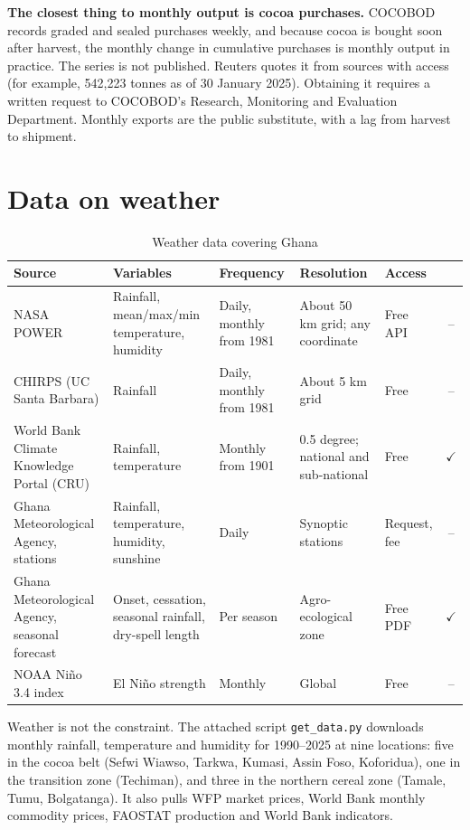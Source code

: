 \documentclass[11pt,letterpaper]{article}
\newcommand{\ok}{$\checkmark$}
\newcommand{\no}{--}
\begin{document}
\textbf{The closest thing to monthly output is cocoa purchases.} COCOBOD records graded and sealed purchases weekly, and because cocoa is bought soon after harvest, the monthly change in cumulative purchases is monthly output in practice. The series is not published. Reuters quotes it from sources with access (for example, 542,223 tonnes as of 30 January 2025). Obtaining it requires a written request to COCOBOD's Research, Monitoring and Evaluation Department. Monthly exports are the public substitute, with a lag from harvest to shipment.

\section{Data on weather}

\begin{table}[H]
\centering\footnotesize
\caption{Weather data covering Ghana}\label{tab:weather}
\begin{tabularx}{\textwidth}{P{3.1cm} L P{2.2cm} P{2.4cm} P{2.2cm} c}
\toprule
\textbf{Source} & \textbf{Variables} & \textbf{Frequency} & \textbf{Resolution} & \textbf{Access} & \\
\midrule
NASA POWER & Rainfall, mean/max/min temperature, humidity & Daily, monthly from 1981 & About 50 km grid; any coordinate & Free API & \no \\
CHIRPS (UC Santa Barbara) & Rainfall & Daily, monthly from 1981 & About 5 km grid & Free & \no \\
World Bank Climate Knowledge Portal (CRU) & Rainfall, temperature & Monthly from 1901 & 0.5 degree; national and sub-national & Free & \ok \\
Ghana Meteorological Agency, stations & Rainfall, temperature, humidity, sunshine & Daily & Synoptic stations & Request, fee & \no \\
Ghana Meteorological Agency, seasonal forecast & Onset, cessation, seasonal rainfall, dry-spell length & Per season & Agro-ecological zone & Free PDF & \ok \\
NOAA Ni\~no 3.4 index & El Ni\~no strength & Monthly & Global & Free & \no \\
\bottomrule
\end{tabularx}
\end{table}

Weather is not the constraint. The attached script \texttt{get\_data.py} downloads monthly rainfall, temperature and humidity for 1990--2025 at nine locations: five in the cocoa belt (Sefwi Wiawso, Tarkwa, Kumasi, Assin Foso, Koforidua), one in the transition zone (Techiman), and three in the northern cereal zone (Tamale, Tumu, Bolgatanga). It also pulls WFP market prices, World Bank monthly commodity prices, FAOSTAT production and World Bank indicators.
\end{document}
